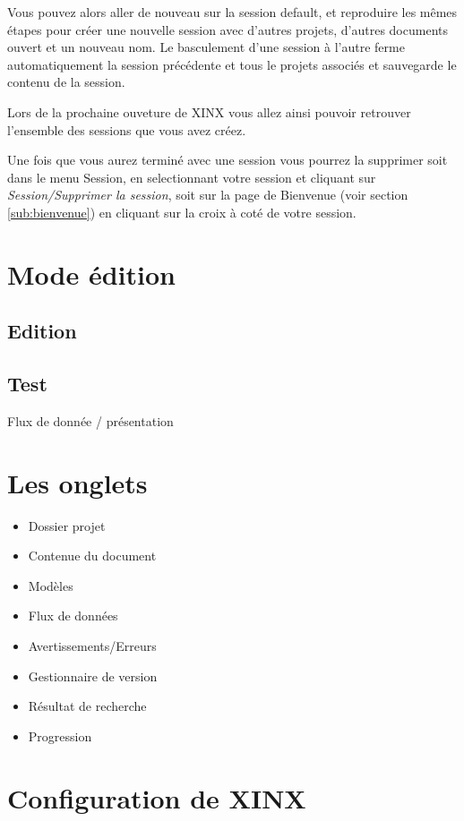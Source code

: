 \documentclass[a4paper,10pt,twoside]{book}
\begin{document}
Vous pouvez alors aller de nouveau sur la session default, et reproduire les mêmes étapes pour créer une nouvelle session avec d'autres projets, d'autres documents ouvert et un nouveau nom. Le basculement d'une session à l'autre ferme automatiquement la session précédente et tous le projets associés et sauvegarde le contenu de la session.

Lors de la prochaine ouveture de XINX vous allez ainsi pouvoir retrouver l'ensemble des sessions que vous avez créez.

Une fois que vous aurez terminé avec une session vous pourrez la supprimer soit dans le menu Session, en selectionnant votre session et cliquant sur \emph{Session/Supprimer la session}, soit sur la page de Bienvenue (voir section \ref{sub:bienvenue}) en cliquant sur la croix à coté de votre session.

\section{Mode édition}

\subsection{Edition}

\subsection{Test}

Flux de donnée / présentation

\section{Les onglets}
\label{sec:dock}

\begin{itemize}
  \item Dossier projet
  \item Contenue du document
  \item Modèles
  \item Flux de données
  \item Avertissements/Erreurs
  \item Gestionnaire de version
  \item Résultat de recherche
  \item Progression
\end{itemize}

\section{Configuration de XINX}
\label{sec:Custom}
\end{document}
